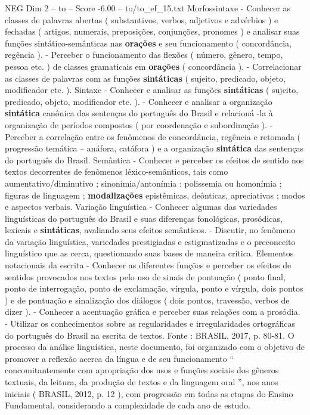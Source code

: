 \begin{textsample}{NEG Dim 2 – to – Score -6.00 – to/to\_ef\_15.txt}
Morfossintaxe - Conhecer as classes de palavras abertas ( substantivos, verbos, adjetivos e advérbios ) e fechadas ( artigos, numerais, preposições, conjunções, pronomes ) e analisar suas funções sintático-semânticas nas \textbf{orações} e seu funcionamento ( concordância, regência ). - Perceber o funcionamento das flexões ( número, gênero, tempo, pessoa etc. ) de classes gramaticais em \textbf{orações} ( concordância ). - Correlacionar as classes de palavras com as funções \textbf{sintáticas} ( sujeito, predicado, objeto, modificador etc. ).
Sintaxe - Conhecer e analisar as funções \textbf{sintáticas} ( sujeito, predicado, objeto, modificador etc. ). - Conhecer e analisar a organização \textbf{sintática} canônica das sentenças do português do Brasil e relacioná -la à organização de períodos compostos ( por coordenação e subordinação ). - Perceber a correlação entre os fenômenos de concordância, regência e retomada ( progressão temática – anáfora, catáfora ) e a organização \textbf{sintática} das sentenças do português do Brasil.
Semântica - Conhecer e perceber os efeitos de sentido nos textos decorrentes de fenômenos léxico-semânticos, tais como aumentativo/diminutivo ; sinonímia/antonímia ; polissemia ou homonímia ; figuras de linguagem ; \textbf{modalizações} epistêmicas, deônticas, apreciativas ; modos e aspectos verbais.
Variação linguística - Conhecer algumas das variedades linguísticas do português do Brasil e suas diferenças fonológicas, prosódicas, lexicais e \textbf{sintáticas}, avaliando seus efeitos semânticos. - Discutir, no fenômeno da variação linguística, variedades prestigiadas e estigmatizadas e o preconceito linguístico que as cerca, questionando suas bases de maneira crítica.
Elementos notacionais da escrita - Conhecer as diferentes funções e perceber os efeitos de sentidos provocados nos textos pelo uso de sinais de pontuação ( ponto final, ponto de interrogação, ponto de exclamação, vírgula, ponto e vírgula, dois pontos ) e de pontuação e sinalização dos diálogos ( dois pontos, travessão, verbos de dizer ). - Conhecer a acentuação gráfica e perceber suas relações com a prosódia. - Utilizar os conhecimentos sobre as regularidades e irregularidades ortográficas do português do Brasil na escrita de textos.
Fonte : BRASIL, 2017, p. 80-81.
O processo da análise linguística, neste documento, foi organizado com o objetivo de promover a reflexão acerca da língua e de seu funcionamento “ concomitantemente com apropriação dos usos e funções sociais dos gêneros textuais, da leitura, da produção de textos e da linguagem oral ”, nos anos iniciais ( BRASIL, 2012, p. 12 ), com progressão em todas as etapas do Ensino Fundamental, considerando a complexidade de cada ano de estudo.

\end{textsample}
